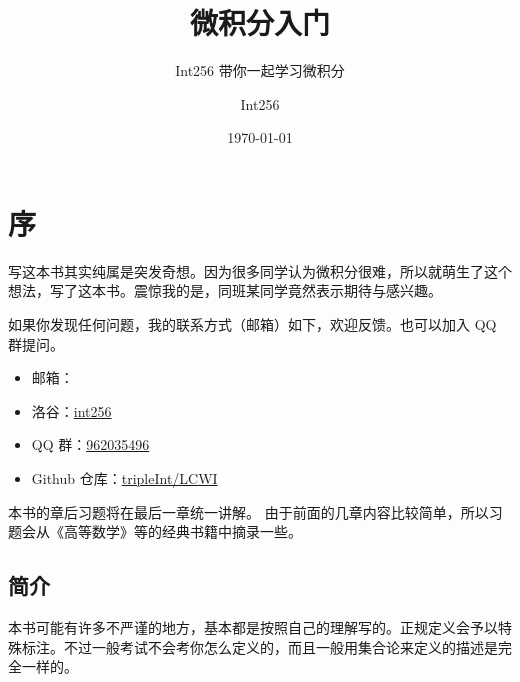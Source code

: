\documentclass[lang=cn,10pt]{template}
\title{微积分入门}
\subtitle{Int256 带你一起学习微积分}
\author{Int256}
\date{\today}
\begin{document}
\maketitle
\frontmatter

\tableofcontents

\mainmatter

\chapter{序}

写这本书其实纯属是突发奇想。因为很多同学认为微积分很难，所以就萌生了这个想法，写了这本书。震惊我的是，同班某同学竟然表示期待与感兴趣。

如果你发现任何问题，我的联系方式（邮箱）如下，欢迎反馈。也可以加入 QQ 群提问。

\begin{itemize}
  \item 邮箱：
  \item 洛谷：\href{https://www.luogu.com.cn/user/344700}{int256}
  \item QQ 群：\href{https://jq.qq.com/?_wv=1027&k=lpfM484S}{962035496}
  \item Github 仓库：\href{https://github.com/tripleInt/LCWI}{tripleInt/LCWI}
\end{itemize}

本书的章后习题将在最后一章统一讲解。
由于前面的几章内容比较简单，所以习题会从《高等数学》等的经典书籍中摘录一些。

\section{简介}

本书可能有许多不严谨的地方，基本都是按照自己的理解写的。正规定义会予以特殊标注。不过一般考试不会考你怎么定义的，而且一般用集合论来定义的描述是完全一样的。
\end{document}
